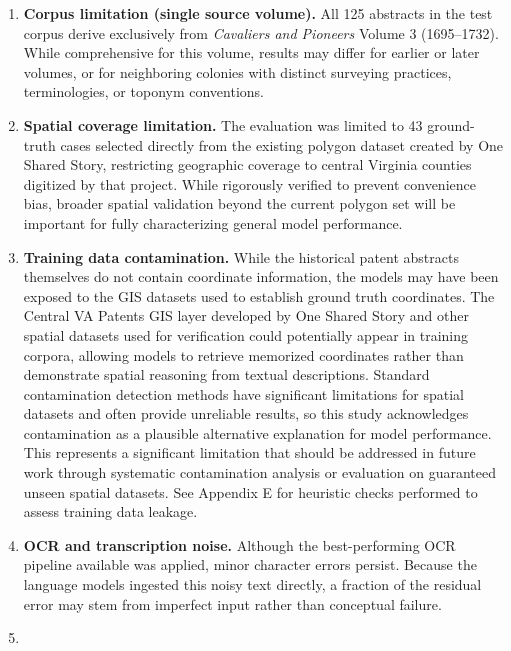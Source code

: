 \begin{enumerate}
\def\labelenumi{\arabic{enumi}.}
\item
  \textbf{Corpus limitation (single source volume).} All 125 abstracts
  in the test corpus derive exclusively from \emph{Cavaliers and
  Pioneers} Volume 3 (1695--1732). While comprehensive for this volume,
  results may differ for earlier or later volumes, or for neighboring
  colonies with distinct surveying practices, terminologies, or toponym
  conventions.
\item
  \textbf{Spatial coverage limitation.} The evaluation was limited to 43
  ground-truth cases selected directly from the existing polygon dataset
  created by One Shared Story, restricting geographic coverage to
  central Virginia counties digitized by that project. While rigorously
  verified to prevent convenience bias, broader spatial validation
  beyond the current polygon set will be important for fully
  characterizing general model performance.
\item
  \textbf{Training data contamination.} While the historical patent
  abstracts themselves do not contain coordinate information, the models
  may have been exposed to the GIS datasets used to establish ground
  truth coordinates. The Central VA Patents GIS layer developed by One
  Shared Story \citep{central_va_patents_gis} and other spatial datasets
  used for verification could potentially appear in training corpora,
  allowing models to retrieve memorized coordinates rather than
  demonstrate spatial reasoning from textual descriptions. Standard
  contamination detection methods have significant limitations for
  spatial datasets and often provide unreliable results, so this study
  acknowledges contamination as a plausible alternative explanation for
  model performance. This represents a significant limitation that
  should be addressed in future work through systematic contamination
  analysis or evaluation on guaranteed unseen spatial datasets. See
  Appendix E for heuristic checks performed to assess training data
  leakage.
\item
  \textbf{OCR and transcription noise.} Although the best-performing OCR
  pipeline available was applied, minor character errors persist.
  Because the language models ingested this noisy text directly, a
  fraction of the residual error may stem from imperfect input rather
  than conceptual failure.
\item
  \DIFaddbegin \textbf{} 
\end{enumerate}

